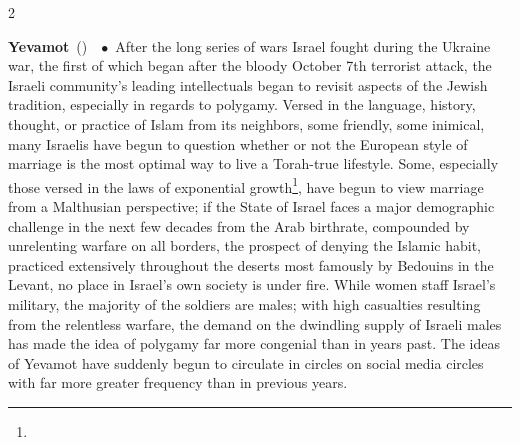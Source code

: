 \documentclass[10pt,a4paper,twoside]{article} %
\newcommand{\entry}[4]{\markboth{#1}{#1}\textbf{#1}\ {(#2)}\ \textit{#3}\ $\bullet$\ {#4}}  %
\begin{document}
\begin{multicols}{2}
\entry {Yevamot} {} {} {After the long series of wars Israel fought during the Ukraine war, the first of which began after the bloody October 7th terrorist attack, the Israeli community's leading intellectuals began to revisit aspects of the Jewish tradition, especially in regards to polygamy. Versed in the language, history, thought, or practice of Islam from its neighbors, some friendly, some inimical, many Israelis have begun to question whether or not the European style of marriage is the most optimal way to live a Torah-true lifestyle. Some, especially those versed in the laws of exponential growth\footnote{}, have begun to view marriage from a Malthusian perspective; if the State of Israel faces a major demographic challenge in the next few decades from the Arab birthrate, compounded by unrelenting warfare on all borders, the prospect of denying the Islamic habit, practiced extensively throughout the deserts most famously by Bedouins in the Levant, no place in Israel's own society is under fire. While women staff Israel's military, the majority of the soldiers are males; with high casualties resulting from the relentless warfare, the demand on the dwindling supply of Israeli males has made the idea of polygamy far more congenial than in years past. The ideas of Yevamot have suddenly begun to circulate in circles on social media circles with far more greater frequency than in previous years. 
} 


\end{multicols}
\end{document}
